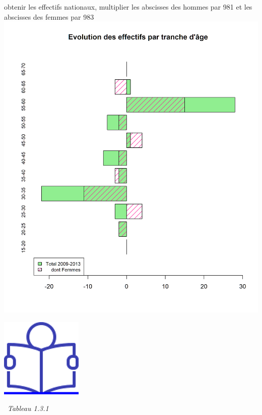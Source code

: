 obtenir les effectifs nationaux, multiplier les abscisses des hommes par
981 et les abscisses des femmes par 983\newpage
\includegraphics{altair_files/figure-latex/unnamed-chunk-17-3.png}

\href{../Docs/Notices/fiche_3.odt}{\includegraphics{icones/Notice.png}}

\newpage

~\emph{Tableau 1.3.1}

